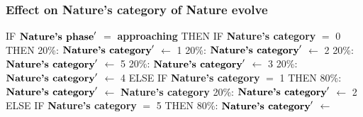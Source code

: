 \documentclass{article}%
\begin{document}
\subsubsection{Effect on Nature's category of Nature evolve}%
\label{ssubsec:Effect on Nature's category of Nature evolve}%
\begin{flushleft}%
IF %
$\mbox{\textbf{Nature's phase}} '$%
$=$%
\textbf{approaching}%
\linebreak%
\hspace*{2em}%
THEN %
IF %
\textbf{Nature's category}%
$=$%
0%
\linebreak%
\hspace*{4em}%
THEN %
\linebreak%
\hspace*{6em}%
20\%: %
$\mbox{\textbf{Nature's category}} '$%
$\leftarrow$%
1%
\linebreak%
\hspace*{6em}%
20\%: %
$\mbox{\textbf{Nature's category}} '$%
$\leftarrow$%
2%
\linebreak%
\hspace*{6em}%
20\%: %
$\mbox{\textbf{Nature's category}} '$%
$\leftarrow$%
5%
\linebreak%
\hspace*{6em}%
20\%: %
$\mbox{\textbf{Nature's category}} '$%
$\leftarrow$%
3%
\linebreak%
\hspace*{6em}%
20\%: %
$\mbox{\textbf{Nature's category}} '$%
$\leftarrow$%
4%
\linebreak%
\hspace*{4em}%
ELSE %
IF %
\textbf{Nature's category}%
$=$%
1%
\linebreak%
\hspace*{6em}%
THEN %
\linebreak%
\hspace*{8em}%
80\%: %
$\mbox{\textbf{Nature's category}} '$%
$\leftarrow$%
\textbf{Nature's category}%
\linebreak%
\hspace*{8em}%
20\%: %
$\mbox{\textbf{Nature's category}} '$%
$\leftarrow$%
2%
\linebreak%
\hspace*{6em}%
ELSE %
IF %
\textbf{Nature's category}%
$=$%
5%
\linebreak%
\hspace*{8em}%
THEN %
\linebreak%
\hspace*{10em}%
80\%: %
$\mbox{\textbf{Nature's category}} '$%
$\leftarrow$%

\end{flushleft}
\end{document}
